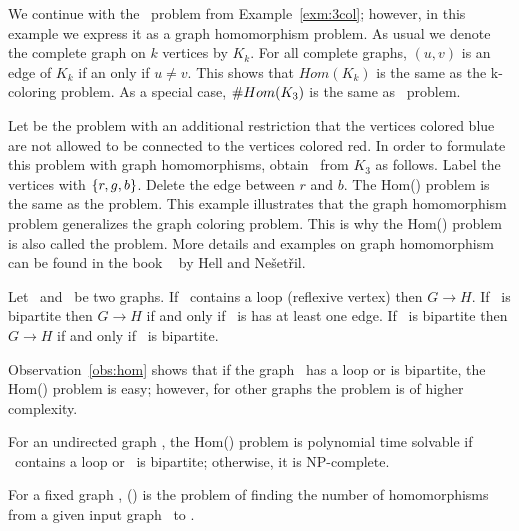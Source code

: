 \begin{example}[\tcoloring]
We continue with the \tcoloring\ problem from Example~\ref{exm:3col}; however, in this example 
we express it as a graph homomorphism problem. As usual we denote the complete graph
on \(k\) vertices by \(K_k\)\@. For all complete graphs, \((u,v)\) is an edge of \(K_k\)
if an only
if \(u\neq v\)\@. This shows that \(Hom(K_k)\) is the same as
the k-coloring problem. As a special case, \(\#Hom(K_3)\) is the same as \ctcol\ problem.
\end{example}

Let  be the  problem with an additional
restriction that the vertices colored blue are not allowed to be connected 
to the vertices colored red. In order to formulate this problem with graph homomorphisms,
obtain \mH\ from \(K_3\) as follows. Label the vertices with \(\{{r,g,b}\}\)\@.
Delete the edge between \(r\) and \(b\). The Hom(\mH) problem is the same as
the  problem.
This example illustrates that the graph homomorphism problem generalizes the graph coloring problem.
This is why
the Hom(\mH) problem is also called the  problem.
More details and examples on graph homomorphism 
can be found in the book ~\cite{hellbook} by Hell and Ne\v{s}et\v{r}il.

\begin{obs}\label{obs:hom}
Let \mG\ and \mH\ be two graphs.
If \mH\ contains a loop (reflexive vertex) then \(G \to H\)\@.
If \mG\ is bipartite then \(G \to H\) if and only if \mH\ is has at least one edge.
If \mH\ is bipartite then \(G \to H\) if and only if \mG\ is bipartite.
\end{obs}

Observation~\ref{obs:hom} shows that if the graph \mH\ has a loop or is bipartite,
the Hom(\mH) problem is easy; however, for other graphs the problem is of higher complexity.

\begin{theorem} 
For an undirected graph \mH, the Hom(\mH) problem is polynomial time solvable if 
\mH\ contains a loop or \mH\ is bipartite; otherwise, it is NP-complete.
\end{theorem}

\begin{defi}[\chom(\mH)]
For a fixed graph \mH,
\chom(\mH) is the problem of finding the number of homomorphisms from a given 
input graph \mG\ to \mH.
\end{defi}

